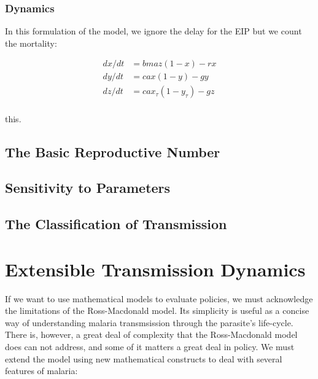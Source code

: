 \documentclass[
]{book}
\begin{document}
\hypertarget{dynamics}{%
\subsection{Dynamics}\label{dynamics}}

In this formulation of the model, we ignore the delay for the EIP but we count the mortality:

\[ 
\begin{array}{rl}
dx/dt &= b m a z (1-x) - r x \\
dy/dt &= c a x (1-y) - g y  \\
dz/dt &= c a x_\tau (1-y_\tau) - g z  \\
\end{array}
\]

this.

\hypertarget{the-basic-reproductive-number}{%
\section{The Basic Reproductive Number}\label{the-basic-reproductive-number}}

\hypertarget{sensitivity-to-parameters}{%
\section{Sensitivity to Parameters}\label{sensitivity-to-parameters}}

\hypertarget{the-classification-of-transmission}{%
\section{The Classification of Transmission}\label{the-classification-of-transmission}}

\hypertarget{extensible-transmission-dynamics}{%
\chapter{Extensible Transmission Dynamics}\label{extensible-transmission-dynamics}}

If we want to use mathematical models to evaluate policies, we must acknowledge the limitations of the Ross-Macdonald model. Its simplicity is useful as a concise way of understanding malaria transmsission through the parasite's life-cycle. There is, however, a great deal of complexity that the Ross-Macdonald model does can not address, and some of it matters a great deal in policy. We must extend the model using new mathematical constructs to deal with several features of malaria:
\end{document}
